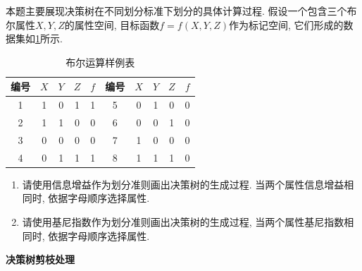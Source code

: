 \documentclass[answers]{exam}  %
\begin{document}
\begin{questions}
本题主要展现决策树在不同划分标准下划分的具体计算过程. 假设一个包含三个布尔属性$X, Y, Z$的属性空间, 目标函数$f=f(X, Y, Z)$作为标记空间, 它们形成的数据集如\ref{ch4_tab:bool_table}所示. 
\begin{table}[ht]
    \centering
    \caption{布尔运算样例表}\label{ch4_tab:bool_table}
    \tabcolsep 15pt
    \begin{tabular}{cccc|c||cccc|c}
        \hline 
        编号 & $X$ & $Y$ & $Z$ & $f$ & 编号 & $X$ & $Y$ & $Z$ & $f$ \\
        \hline 1 & 1 & 0 & 1 & 1 & 5 & 0 & 1 & 0 & 0\\
        2 & 1 & 1 & 0 & 0 & 6 & 0 & 0 & 1 & 0 \\
        3 & 0 & 0 & 0 & 0 & 7 & 1 & 0 & 0 & 0\\
        4 & 0 & 1 & 1 & 1 & 8 & 1 & 1 & 1 & 0\\
        \hline
    \end{tabular}
\end{table}
\begin{enumerate}
    \item 请使用信息增益作为划分准则画出决策树的生成过程. 当两个属性信息增益相同时, 依据字母顺序选择属性. 
    \item 请使用基尼指数作为划分准则画出决策树的生成过程, 当两个属性基尼指数相同时, 依据字母顺序选择属性. 
\end{enumerate}
	
	\begin{solution}
	\end{solution}


\question [25] \textbf{决策树剪枝处理} \label{ch4_prob:prunning}


\end{questions}
\end{document}
